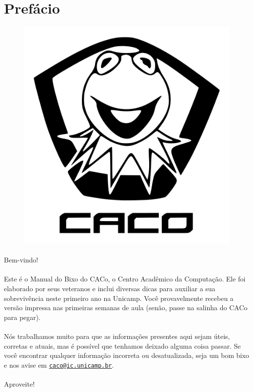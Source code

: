 \documentclass[a4paper,10pt]{book}
\newcommand{\email}[1]{\href{mailto:#1}{\nolinkurl{#1}}}
\begin{document}
\clearpage

\section*{Prefácio}
\begin{figure}[H]
    \centering
    \includegraphics[width=.65\textwidth]{img/caco/logo.pdf}
\end{figure}
\paragraph{}
Bem-vindo!

\paragraph{}
Este é o Manual do Bixo do CACo, o Centro Acadêmico da Computação.  Ele foi
elaborado por seus veteranos e inclui diversas dicas para auxiliar a sua
sobrevivência neste primeiro ano na Unicamp.  Você provavelmente recebeu a
versão impressa nas primeiras semanas de aula (senão, passe na salinha do CACo
para pegar).

\paragraph{}
Nós trabalhamos muito para que as informações presentes aqui sejam úteis,
corretas e atuais, mas é possível que tenhamos deixado alguma coisa passar. Se
você encontrar qualquer informação incorreta ou desatualizada, seja um bom bixo
e nos avise em \email{caco@ic.unicamp.br}.

\paragraph{}
Aproveite!
\end{document}
